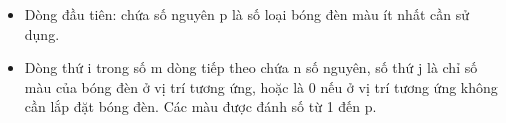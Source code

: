 \begin{itemize}
	\item     Dòng đầu tiên: chứa số nguyên p là số loại bóng đèn màu ít nhất cần sử dụng.   
	\item     Dòng thứ i trong số m dòng tiếp theo chứa n số nguyên, số thứ j là chỉ số màu của bóng đèn ở vị trí tương ứng, hoặc là 0 nếu ở vị trí tương ứng   không cần lắp đặt bóng đèn. Các màu được đánh số từ 1 đến p.   
\end{itemize}

\